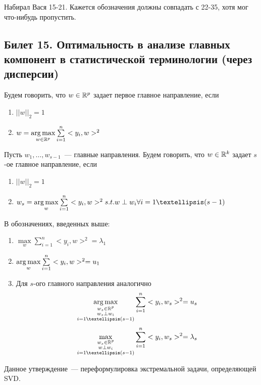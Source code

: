 {\color{blue} Набирал Вася 15-21. Кажется обозначения должны совпадать с 22-35, хотя мог что-нибудь пропустить.}
\subsection{Билет 15. Оптимальность в анализе главных компонент в статистической терминологии (через дисперсии)}

\begin{dfn} Будем говорить, что $w \in \mathbb{R}^p$ задает первое главное направление, если 
\begin{enumerate}
\item $||w||_2 = 1$
\item $w = \operatorname*{arg\,max}\limits_{w \in \mathbb{R}^p}\sum \limits_{i=1}^n <y_i, w>^2 $
\end{enumerate}
\end{dfn}



\begin{dfn} Пусть $w_1, …, w_{s-1}$ — главные направления. Будем говорить, что $w \in \mathbb{R}^k$ задает $s$-ое главное направление, если 
\begin{enumerate}
\item $||w||_2 = 1$
\item $w_s = \argmax\limits_{w}\sum \limits_{i=1}^n <y_i, w>^2 s.t. w \perp w_i \forall i=1…(s-1) $
\end{enumerate}
\end{dfn}


\begin{thm}
В обозначениях, введенных выше:

\begin{enumerate}
\item $\max\limits_{w}\sum \limits_{i=1}^n <y_i, w>^2  = \lambda_1$
\item $ \operatorname*{arg\,max}\limits_{w}\sum \limits_{i=1}^n <y_i, w>^2 = u_1$
\item Для $s$-ого главного направления аналогично 
$$ \argmax\limits_{\substack{w_s \in \R^p \\ w_s \perp w_i\\ i=1…(s-1)}}\sum \limits_{i=1}^n <y_i, w_s>^2 = u_s$$
$$ \max\limits_{\substack{w_s \in \R^p\\ w \perp w_i\\ i=1…(s-1)}}\sum \limits_{i=1}^n <y_i, w_s>^2 = \lambda_s$$
\end{enumerate}
\end{thm}

Данное утверждение — переформулировка экстремальной задачи, определяющей SVD.

